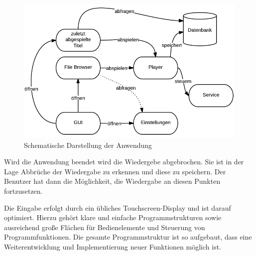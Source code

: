 \begin{figure}
\begin{center}
\includegraphics[scale=0.6]{images/konzept}
\caption{Schematische Darstellung der Anwendung}
\label{konzept}
\end{center}
\end{figure}

Wird die Anwendung beendet wird die Wiedergebe abgebrochen. Sie ist in der Lage Abbrüche der Wiedergabe zu erkennen und diese zu speichern. Der Benutzer hat dann die Möglichkeit, die Wiedergabe an diesen Punkten fortzusetzen.

Die Eingabe erfolgt durch ein übliches Touchscreen-Display und ist darauf optimiert. Hierzu gehört klare und einfache Programmstrukturen sowie ausreichend große Flächen für Bedienelemente und Steuerung von Programmfunktionen. Die gesamte Programmstruktur ist so aufgebaut, dass eine Weiterentwicklung und Implementierung neuer Funktionen möglich ist.